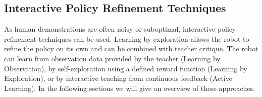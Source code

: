\subsection{Interactive Policy Refinement Techniques}\label{subsec:Other RP Methods}
As human demonstrations are often noisy or suboptimal, interactive policy refinement techniques can be used.
Learning by exploration allows the robot to refine the policy on its own and can be combined with  teacher critique. 
The robot can learn from observation data provided by the teacher (Learning by Observation), by self-exploration using a defined reward function (Learning by Exploration), or by interactive teaching from continuous feedback (Active Learning). In the following sections we will give an overview of these approaches.

%


